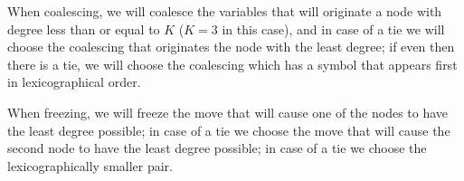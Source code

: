 \documentclass[docid=2019]{comp_exam_round2}
\begin{document}
\begin{center}
    \small
\end{center}

\ansseparator

\noindent
When coalescing, we will coalesce the variables that will originate a node with degree less than or equal to $K$ ($K=3$ in this case), and in case of a tie we will choose the coalescing that originates the node with the least degree; if even then there is a tie, we will choose the coalescing which has a symbol that appears first in lexicographical order.

When freezing, we will freeze the move that will cause one of the nodes to have the least degree possible; in case of a tie we choose the move that will cause the second node to have the least degree possible; in case of a tie we choose the lexicographically smaller pair.
\end{document}
